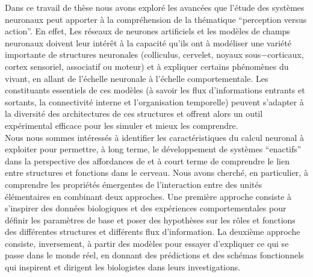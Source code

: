 \DontNumberThisInToc
\DontFrameThisInToc
{}




Dans ce travail de thèse nous avons exploré les avancées que l'étude des systèmes neuronaux peut apporter à la compréhension de la thématique ``perception versus action''. En effet, Les réseaux de neurones artificiels et les modèles de champs neuronaux doivent leur intérêt à la capacité qu'ils ont à modéliser une variété importante de structures neuronales (colliculus, cervelet, noyaux sous$-$corticaux, cortex sensoriel, associatif ou moteur) et à expliquer certains phénomènes du vivant, en allant de l'échelle neuronale à l'échelle comportementale. Les constituants essentiels de ces modèles (à savoir les flux d'informations entrants et sortants, la connectivité interne et l'organisation temporelle) peuvent s'adapter à la diversité des architectures de ces structures et offrent alors un outil expérimental efficace pour les simuler et mieux les comprendre. \\%

Nous nous sommes intéressés à identifier les caractéristiques du calcul neuronal à exploiter pour permettre, à long terme, le développement de systèmes ``enactifs'' dans la perspective des affordances de \cite{Varela:1993} et à court terme de comprendre le lien entre structures et fonctions dans le cerveau. Nous avons cherché, en particulier, à comprendre les propriétés émergentes de l'interaction entre des unités élémentaires en combinant deux approches. Une première approche consiste à s'inspirer des données biologiques et des expériences comportementales pour définir les paramètres de base et poser des hypothèses sur les rôles et fonctions des différentes structures et différents flux d'information. La deuxième approche consiste, inversement, à partir des modèles pour essayer d'expliquer ce qui se passe dans le monde réel, en donnant des prédictions et des schémas fonctionnels qui inspirent et dirigent les biologistes dans leurs investigations.\\%

